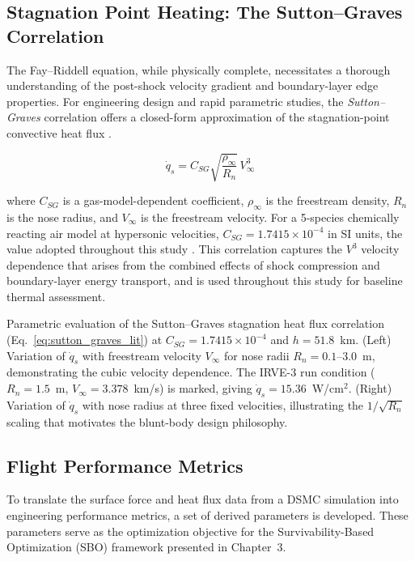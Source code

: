 \subsection{Stagnation Point Heating: The Sutton--Graves Correlation}
The Fay--Riddell equation, while physically complete, necessitates a thorough understanding of the post-shock velocity gradient and boundary-layer edge properties. For engineering design and rapid parametric studies, the \textit{Sutton--Graves} correlation offers a closed-form approximation of the stagnation-point convective heat flux \cite{sutton1971gravesh}.

\begin{equation}
    \dot{q}_s = C_{SG} \sqrt{\frac{\rho_{\infty}}{R_n}} \, V_{\infty}^{3}
    \label{eq:sutton_graves_lit}
\end{equation}

\noindent where $C_{SG}$ is a gas-model-dependent coefficient, $\rho_{\infty}$ is the freestream density, $R_n$ is the nose radius, and $V_{\infty}$ is the freestream velocity. For a 5-species chemically reacting air model at hypersonic velocities, $C_{SG} = 1.7415 \times 10^{-4}$ in SI units, the value adopted throughout this study \cite{sutton1971gravesh}. This correlation captures the $V^{3}$ velocity dependence that arises from the combined effects of shock compression and boundary-layer energy transport, and is used throughout this study for baseline thermal assessment.

Parametric evaluation of the Sutton--Graves stagnation heat flux correlation (Eq.~\ref{eq:sutton_graves_lit}) at $C_{SG} = 1.7415 \times 10^{-4}$ and $h = 51.8$~km. (Left) Variation of $\dot{q}_s$ with freestream velocity $V_{\infty}$ for nose radii $R_n = 0.1$--$3.0$~m, demonstrating the cubic velocity dependence. The IRVE-3 run condition ($R_n = 1.5$~m, $V_{\infty} = 3.378$~km/s) is marked, giving $\dot{q}_s = 15.36$~W/cm$^2$. (Right) Variation of $\dot{q}_s$ with nose radius at three fixed velocities, illustrating the $1/\sqrt{R_n}$ scaling that motivates the blunt-body design philosophy.


\subsection{Flight Performance Metrics}
To translate the surface force and heat flux data from a DSMC simulation into engineering performance metrics, a set of derived parameters is developed. These parameters serve as the optimization objective for the Survivability-Based Optimization (SBO) framework presented in Chapter~3.

